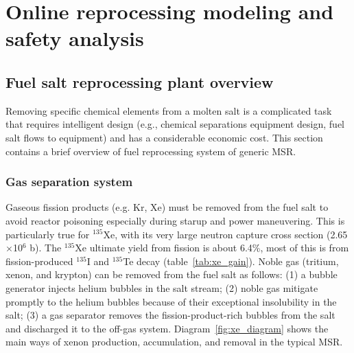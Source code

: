 \chapter[Online reprocessing modeling and safety analysis]{Online reprocessing 
modeling and safety analysis}
\section{Fuel salt reprocessing plant overview}
Removing specific chemical elements from a molten salt is a complicated 
task that requires intelligent design (e.g., chemical separations equipment 
design, fuel salt flows to equipment) and has a considerable economic cost. 
This section contains a brief overview of fuel reprocessing system of generic 
\gls{MSR}.

\subsection{Gas separation system}
Gaseous fission products (e.g. Kr, Xe) must be removed from the fuel salt 
to avoid reactor poisoning especially during starup and power maneuvering. 
This is particularly true for $^{135}$Xe, with its very large neutron capture 
cross section (2.65$\times$10$^6$ b). The $^{135}$Xe ultimate yield from 
fission is about 6.4\%, most of this is from fission-produced $^{135}$I and 
$^{135}$Te decay (table~\ref{tab:xe_gain}). Noble gas (tritium, xenon, and 
krypton) can be removed from the fuel salt as follows: (1) a bubble generator 
injects helium bubbles in the salt stream; (2) noble gas mitigate promptly 
to the helium bubbles because of their exceptional insolubility in the salt; 
(3) a gas separator removes the fission-product-rich bubbles from
the salt 
and discharged it to the off-gas system. Diagram~\ref{fig:xe_diagram} shows 
the main ways of xenon production, accumulation, and removal in the typical 
\gls{MSR}.
